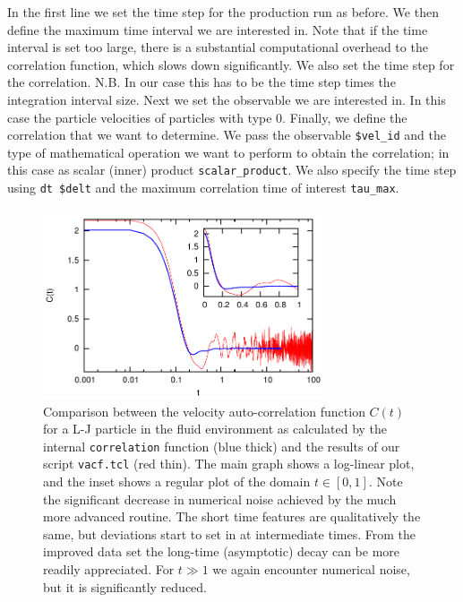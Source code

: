 \documentclass[
paper=a4,                       %
fontsize=11pt,                  %
twoside,                        %
footsepline,                    %
headsepline,                    %
headinclude=false,              %
footinclude=false,              %
pagesize,                       %
]{scrartcl}
\begin{document}
\noindent In the first line we set the time step for the production run as before. We then define the maximum time interval we are interested in. Note that if the time interval is set too large, there is a substantial computational overhead to the correlation function, which slows down \es{} significantly. We also set the time step for the correlation. N.B. In our case this has to be the time step times the integration interval size. Next we set the observable we are interested in. In this case the particle velocities of particles with type 0. Finally, we define the correlation that we want to determine. We pass the observable \texttt{\$vel\_id} and the type of mathematical operation we want to perform to obtain the correlation; in this case as scalar (inner) product \texttt{scalar\_product}. We also specify the time step using \texttt{dt \$delt} and the maximum correlation time of interest \texttt{tau\_max}.

\begin{figure}[!ht]
\begin{center}
\includegraphics[width=0.75\textwidth]{figures/vacf_internal}
\caption{\label{fig:vacf_internal} Comparison between the velocity auto-correlation function $C(t)$ for a L-J particle in the fluid environment as calculated by the internal \es{} \lstinline|correlation| function (blue thick) and the results of our script \texttt{vacf.tcl} (red thin). The main graph shows a log-linear plot, and the inset shows a regular plot of the domain $t \in [0,1]$. Note the significant decrease in numerical noise achieved by the much more advanced \es{} routine. The short time features are qualitatively the same, but deviations start to set in at intermediate times. From the improved data set the long-time (asymptotic) decay can be more readily appreciated. For $t \gg 1$ we again encounter numerical noise, but it is significantly reduced.}
\end{center}
\end{figure}
\end{document}
